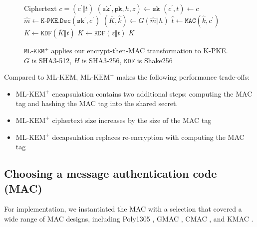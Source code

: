 \documentclass[journal=tches,submission]{iacrtrans}
\newcommand{\decrypt}{\texttt{Dec}}
\newcommand{\mac}{\texttt{MAC}}
\newcommand{\pk}{\texttt{pk}}
\newcommand{\sk}{\texttt{sk}}
\def\mlkemplus{\text{ML-KEM}^+}
\begin{document}
\begin{figure}[h]
\begin{minipage}[t]{0.49\textwidth}
\begin{algorithm}[H]
\begin{algorithmic}[1]
                \Require Ciphertext $c = (c^\prime \Vert t)$
                \State $(\sk^\prime, \pk, h, z) \leftarrow \sk$
                \State $(c^\prime, t) \leftarrow c$
                \State $\hat{m} \leftarrow \texttt{K-PKE}.\decrypt(\sk^\prime, c^\prime)$
                \State $(\overline{K}, \hat{k}) \leftarrow G(\hat{m} \Vert h)$
                \State $\hat{t} \leftarrow \mac(\hat{k}, c^\prime)$
                    \State $K \leftarrow \texttt{KDF}(\overline{K} \Vert t)$
                \Else
                    \State $K \leftarrow \texttt{KDF}(z \Vert t)$
                \EndIf
                \State \Return $K$
            \end{algorithmic}
        \end{algorithm}
    \end{minipage}

    \caption{$\texttt{ML-KEM}^+$ applies our encrypt-then-MAC transformation to K-PKE. $G$ is SHA3-512, $H$ is SHA3-256, $\texttt{KDF}$ is Shake256}\label{fig:ml-kem-plus-routines}
\end{figure}

Compared to ML-KEM, $\mlkemplus$ makes the following performance trade-offs: \begin{itemize}
    \item $\mlkemplus$ encapsulation contains two additional steps: computing the MAC tag and hashing the MAC tag into the shared secret.
    \item $\mlkemplus$ ciphertext size increases by the size of the MAC tag
    \item $\mlkemplus$ decapsulation replaces re-encryption with computing the MAC tag
\end{itemize}

\subsection{Choosing a message authentication code (MAC)}\label{sec:choosing-a-message-authenticator}
For implementation, we instantiated the MAC with a selection that covered a wide range of MAC designs, including Poly1305 \cite{bernstein2005poly1305}, GMAC \cite{mcgrew2004galois}, CMAC \cite{iwata2003omac}\cite{black2000cbc}, and KMAC \cite{SP80053r4}. 
\end{document}
